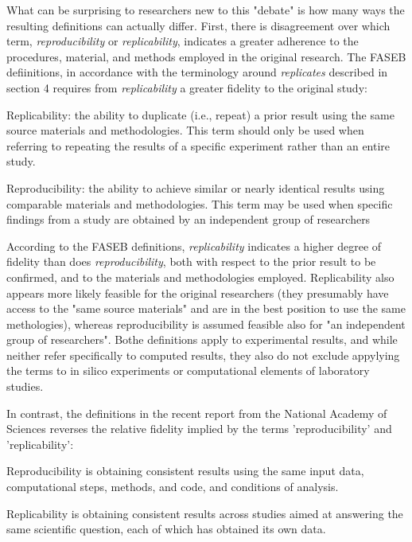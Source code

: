 What can be surprising to researchers new to this "debate" is how many ways the resulting definitions
	can actually differ.
First, there is disagreement over which term, \emph{reproducibility} or \emph{replicability}, indicates
	 a greater adherence to the procedures, material,  and methods employed in the original research.
The FASEB defiinitions, in accordance with the terminology around \emph{replicates} described in section 4
	requires from \emph{replicability} a greater fidelity to the original study:

	Replicability: the ability to duplicate (i.e., repeat) a prior result using the same
	source materials and methodologies. This term should only be used when
	referring to repeating the results of a specific experiment rather than an
	entire study.

	Reproducibility: the ability to achieve similar or nearly identical results using comparable materials and methodologies. 
	This term may be used when specific findings from a study are obtained by an independent group of researchers

According to the FASEB definitions, \emph{replicability} indicates a higher degree of fidelity than does \emph{reproducibility}, 
	both with respect to the prior result to be confirmed, and to the materials and methodologies employed.
Replicability also appears more likely feasible for the original researchers (they presumably have access to the 
	"same source materials" and are in the best position to use the same methologies), whereas reproducibility is 
	assumed feasible also for "an independent group of researchers". 
Bothe definitions apply to experimental results, and while neither refer specifically to computed results, they also
	do not exclude appylying the terms to in silico experiments or computational elements of laboratory studies.

 In contrast, the definitions in the recent report from the National Academy of Sciences reverses the relative fidelity
implied by the  terms 'reproducibility' and 'replicability':

	Reproducibility is obtaining consistent results using the same input data, computational
	steps, methods, and code, and conditions of analysis. 

	Replicability is obtaining consistent results across studies aimed at answering the same
	scientific question, each of which has obtained its own data.


